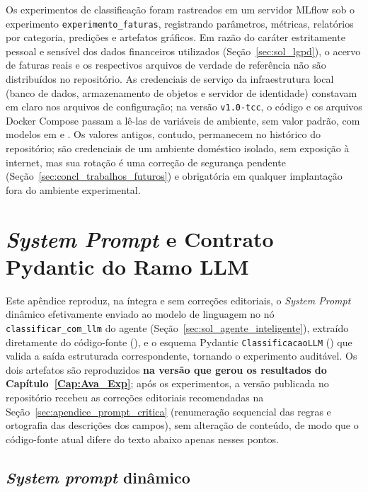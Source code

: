 \begin{apendicesenv}
Os experimentos de classificação foram rastreados em um servidor MLflow sob o experimento \texttt{experimento\_faturas}, registrando parâmetros, métricas, relatórios por categoria, predições e artefatos gráficos. Em razão do caráter estritamente pessoal e sensível dos dados financeiros utilizados (Seção~\ref{sec:sol_lgpd}), o acervo de faturas reais e os respectivos arquivos de verdade de referência não são distribuídos no repositório. As credenciais de serviço da infraestrutura local (banco de dados, armazenamento de objetos e servidor de identidade) constavam em claro nos arquivos de configuração; na versão \texttt{v1.0-tcc}, o código e os arquivos Docker Compose passam a lê-las de variáveis de ambiente, sem valor padrão, com modelos em  e . Os valores antigos, contudo, permanecem no histórico do repositório; são credenciais de um ambiente doméstico isolado, sem exposição à internet, mas sua rotação é uma correção de segurança pendente (Seção~\ref{sec:concl_trabalhos_futuros}) e obrigatória em qualquer implantação fora do ambiente experimental.

\chapter{\textit{System Prompt} e Contrato Pydantic do Ramo LLM}
\label{apendice:system_prompt}

Este apêndice reproduz, na íntegra e sem correções editoriais, o \textit{System Prompt} dinâmico efetivamente enviado ao modelo de linguagem no nó \texttt{classificar\_com\_llm} do agente (Seção~\ref{sec:sol_agente_inteligente}), extraído diretamente do código-fonte (), e o esquema Pydantic \texttt{ClassificacaoLLM} () que valida a saída estruturada correspondente, tornando o experimento auditável. Os dois artefatos são reproduzidos \textbf{na versão que gerou os resultados do Capítulo~\ref{Cap:Ava_Exp}}; após os experimentos, a versão publicada no repositório recebeu as correções editoriais recomendadas na Seção~\ref{sec:apendice_prompt_critica} (renumeração sequencial das regras e ortografia das descrições dos campos), sem alteração de conteúdo, de modo que o código-fonte atual difere do texto abaixo apenas nesses pontos.

\section{\textit{System prompt} dinâmico}


\end{apendicesenv}
